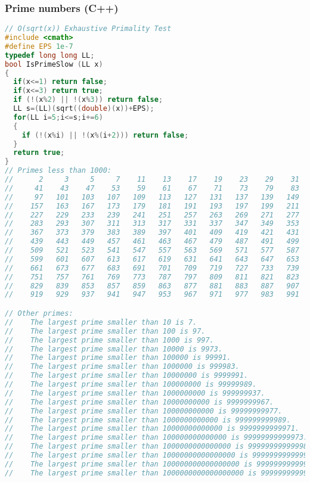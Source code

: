 \subsubsection{Prime numbers (C++)}
\begin{lstlisting}[language=C++]
// O(sqrt(x)) Exhaustive Primality Test
#include <cmath>
#define EPS 1e-7
typedef long long LL;
bool IsPrimeSlow (LL x)
{
  if(x<=1) return false;
  if(x<=3) return true;
  if (!(x%2) || !(x%3)) return false;
  LL s=(LL)(sqrt((double)(x))+EPS);
  for(LL i=5;i<=s;i+=6)
  {
    if (!(x%i) || !(x%(i+2))) return false;
  }
  return true;
}
// Primes less than 1000:
//      2     3     5     7    11    13    17    19    23    29    31    37
//     41    43    47    53    59    61    67    71    73    79    83    89
//     97   101   103   107   109   113   127   131   137   139   149   151
//    157   163   167   173   179   181   191   193   197   199   211   223
//    227   229   233   239   241   251   257   263   269   271   277   281
//    283   293   307   311   313   317   331   337   347   349   353   359
//    367   373   379   383   389   397   401   409   419   421   431   433
//    439   443   449   457   461   463   467   479   487   491   499   503
//    509   521   523   541   547   557   563   569   571   577   587   593
//    599   601   607   613   617   619   631   641   643   647   653   659
//    661   673   677   683   691   701   709   719   727   733   739   743
//    751   757   761   769   773   787   797   809   811   821   823   827
//    829   839   853   857   859   863   877   881   883   887   907   911
//    919   929   937   941   947   953   967   971   977   983   991   997

// Other primes:
//    The largest prime smaller than 10 is 7.
//    The largest prime smaller than 100 is 97.
//    The largest prime smaller than 1000 is 997.
//    The largest prime smaller than 10000 is 9973.
//    The largest prime smaller than 100000 is 99991.
//    The largest prime smaller than 1000000 is 999983.
//    The largest prime smaller than 10000000 is 9999991.
//    The largest prime smaller than 100000000 is 99999989.
//    The largest prime smaller than 1000000000 is 999999937.
//    The largest prime smaller than 10000000000 is 9999999967.
//    The largest prime smaller than 100000000000 is 99999999977.
//    The largest prime smaller than 1000000000000 is 999999999989.
//    The largest prime smaller than 10000000000000 is 9999999999971.
//    The largest prime smaller than 100000000000000 is 99999999999973.
//    The largest prime smaller than 1000000000000000 is 999999999999989.
//    The largest prime smaller than 10000000000000000 is 9999999999999937.
//    The largest prime smaller than 100000000000000000 is 99999999999999997.
//    The largest prime smaller than 1000000000000000000 is 999999999999999989.

\end{lstlisting}
